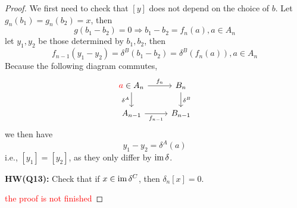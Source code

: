 \begin{proof}
    We first need to check that $[y]$ does not depend on the choice of $b$. Let $g_n(b_1)=g_n(b_2)=x$, then 
    \begin{equation*}
        g(b_1-b_2)=0\Rightarrow b_1-b_2=f_n(a), a\in A_n
    \end{equation*}
    let $y_1, y_2$ be those determined by $b_1, b_2$, then 
    \begin{equation*}
        f_{n-1}(y_1-y_2)=\delta^B(b_1-b_2)=\delta^B(f_n(a)), a\in A_n
    \end{equation*}
    Because the following diagram commutes,
    \[\begin{tikzcd}
        {\textcolor{red}{a}\in A_n} & {B_n} \\
        {A_{n-1}} & {B_{n-1}}
        \arrow["{f_n}", from=1-1, to=1-2]
        \arrow["{\delta^A}"', from=1-1, to=2-1]
        \arrow["{\delta^B}", from=1-2, to=2-2]
        \arrow["{f_{n-1}}"', from=2-1, to=2-2]
    \end{tikzcd}\]
    we then have 
    \begin{equation*}
        y_1-y_2=\delta^A(a)
    \end{equation*}
    i.e., $[y_1]=[y_2]$, as they only differ by $\operatorname{im}\delta$.

    \begin{prob}
        \textbf{HW(Q13):} Check that if $x\in\operatorname{im}\delta^C$, then $\delta_n[x]=0$.
    \end{prob}
    \textcolor{red}{the proof is not finished}
\end{proof}


